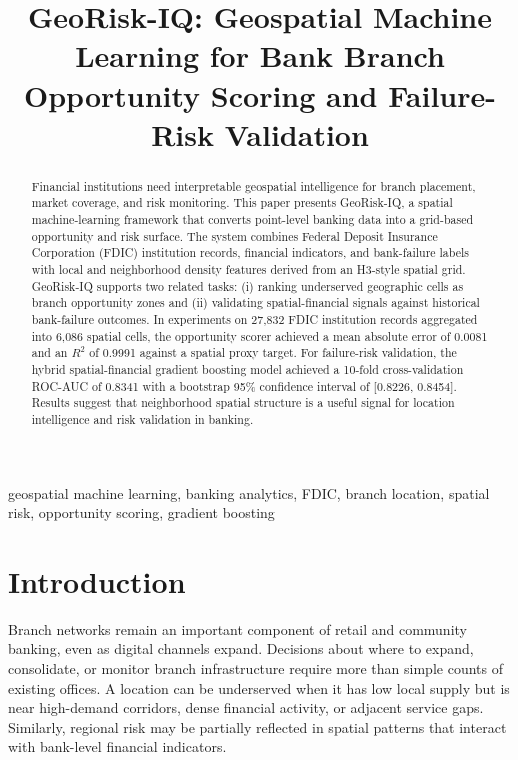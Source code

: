 \documentclass[conference]{IEEEtran}
\begin{document}
\title{GeoRisk-IQ: Geospatial Machine Learning for Bank Branch Opportunity Scoring and Failure-Risk Validation}

\author{
}

\maketitle

\begin{abstract}
Financial institutions need interpretable geospatial intelligence for branch
placement, market coverage, and risk monitoring. This paper presents
GeoRisk-IQ, a spatial machine-learning framework that converts point-level
banking data into a grid-based opportunity and risk surface. The system
combines Federal Deposit Insurance Corporation (FDIC) institution records,
financial indicators, and bank-failure labels with local and neighborhood
density features derived from an H3-style spatial grid. GeoRisk-IQ supports
two related tasks: (i) ranking underserved geographic cells as branch
opportunity zones and (ii) validating spatial-financial signals against
historical bank-failure outcomes. In experiments on 27,832 FDIC institution
records aggregated into 6,086 spatial cells, the opportunity scorer achieved
a mean absolute error of 0.0081 and an $R^2$ of 0.9991 against a spatial
proxy target. For failure-risk validation, the hybrid spatial-financial
gradient boosting model achieved a 10-fold cross-validation ROC-AUC of
0.8341 with a bootstrap 95\% confidence interval of [0.8226, 0.8454].
Results suggest that neighborhood spatial structure is a useful signal for
location intelligence and risk validation in banking.
\end{abstract}

\begin{IEEEkeywords}
geospatial machine learning, banking analytics, FDIC, branch location,
spatial risk, opportunity scoring, gradient boosting
\end{IEEEkeywords}

\section{Introduction}
Branch networks remain an important component of retail and community
banking, even as digital channels expand. Decisions about where to expand,
consolidate, or monitor branch infrastructure require more than simple counts
of existing offices. A location can be underserved when it has low local
supply but is near high-demand corridors, dense financial activity, or
adjacent service gaps. Similarly, regional risk may be partially reflected in
spatial patterns that interact with bank-level financial indicators.
\end{document}
